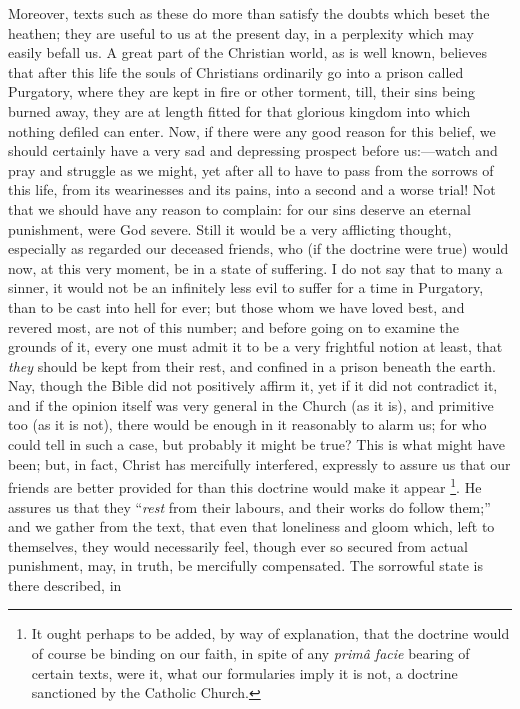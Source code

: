 Moreover, texts such as these do more than satisfy the doubts which
beset the heathen; they are useful to us at the present day, in a
perplexity which may easily befall us. A great part of the Christian
world, as is well known, believes that after this life the souls of
Christians ordinarily go into a prison called Purgatory, where they
are kept in fire or other torment, till, their sins being burned away,
they are at length fitted for that glorious kingdom into which nothing
defiled can enter. Now, if there were any good reason for this belief,
we should certainly have a very sad and depressing prospect before us:—watch
and pray and struggle as we might, yet after all to have to pass from
the sorrows of this life, from its wearinesses and its pains, into a
second and a worse trial! Not that we should have any reason to
complain: for our sins deserve an eternal punishment, were God severe.
Still it would be a very afflicting thought, especially as regarded
our deceased friends, who (if the doctrine were true) would now, at
this very moment, be in a state of suffering. I do not say that to
many a sinner, it would not be an infinitely less evil to suffer for a
time in Purgatory, than to be cast into hell for ever; but those whom
we have loved best, and revered most, are not of this number; and
before going on to examine the grounds of it, every one must admit it
to be a very frightful notion at least, that \emph{they} should be
kept from their rest, and confined in a prison beneath the earth. Nay,
though the Bible did not positively affirm it, yet if it did not
contradict it, and if the opinion itself was very general in the
Church (as it is), and primitive too (as it is not), there would be
enough in it reasonably to alarm us; for who could tell in such a
case, but probably it might be true? This is what might have been;
but, in fact, Christ has mercifully interfered, expressly to assure us
that our friends are better provided for than this doctrine would make
it appear \footnote{It ought perhaps to be added, by way of
explanation, that the doctrine would of course be binding on our
faith, in spite of any \emph{primâ facie} bearing of certain texts,
were it, what our formularies imply it is not, a doctrine sanctioned
by the Catholic Church.}. He assures us
that they ``\emph{rest} from their labours, and their works do
follow them;'' and we gather from the text, that even that
loneliness and gloom which, left to themselves, they would necessarily
feel, though ever so secured from actual punishment, may, in truth, be
mercifully compensated. The sorrowful state is there described, in
